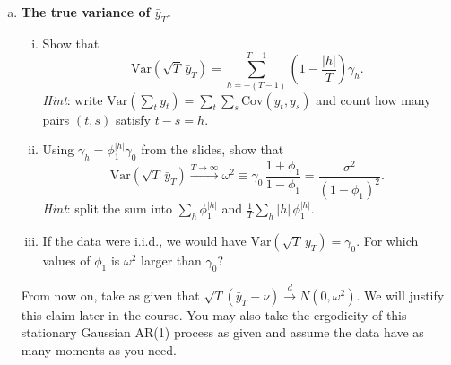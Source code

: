 \documentclass[11pt]{article}
\theoremstyle{definition}
\newcommand{\Var}{\mathrm{Var}}
\begin{document}
\begin{enumerate}[a)]
	\item \textbf{The true variance of $\bar{y}_T$.}
	\begin{enumerate}[(i)]
		\item Show that
		\begin{equation*}
			\Var\left(\sqrt{T}\,\bar{y}_T\right) = \sum_{h=-(T-1)}^{T-1}\left(1 - \frac{|h|}{T}\right)\gamma_h.
		\end{equation*}
		\textit{Hint}: write $\Var(\sum_t y_t) = \sum_t \sum_s \mathrm{Cov}(y_t, y_s)$ and count how many pairs $(t, s)$ satisfy $t - s = h$.
		\item Using $\gamma_h = \phi_1^{|h|}\gamma_0$ from the slides, show that
		\begin{equation*}
			\Var\left(\sqrt{T}\,\bar{y}_T\right) \xrightarrow{T \to \infty} \omega^2 \equiv \gamma_0\,\frac{1+\phi_1}{1-\phi_1} = \frac{\sigma^2}{(1-\phi_1)^2}.
		\end{equation*}
		\textit{Hint}: split the sum into $\sum_h \phi_1^{|h|}$ and $\frac{1}{T}\sum_h |h|\,\phi_1^{|h|}$.
		\item If the data were i.i.d., we would have $\Var(\sqrt{T}\,\bar{y}_T) = \gamma_0$. For which values of $\phi_1$ is $\omega^2$ larger than $\gamma_0$?
	\end{enumerate}
	From now on, take as given that $\sqrt{T}(\bar{y}_T - \nu) \xrightarrow{d} N(0, \omega^2)$. We will justify this claim later in the course. You may also take the ergodicity of this stationary Gaussian AR(1) process as given and assume the data have as many moments as you need.


\end{enumerate}
\end{document}
